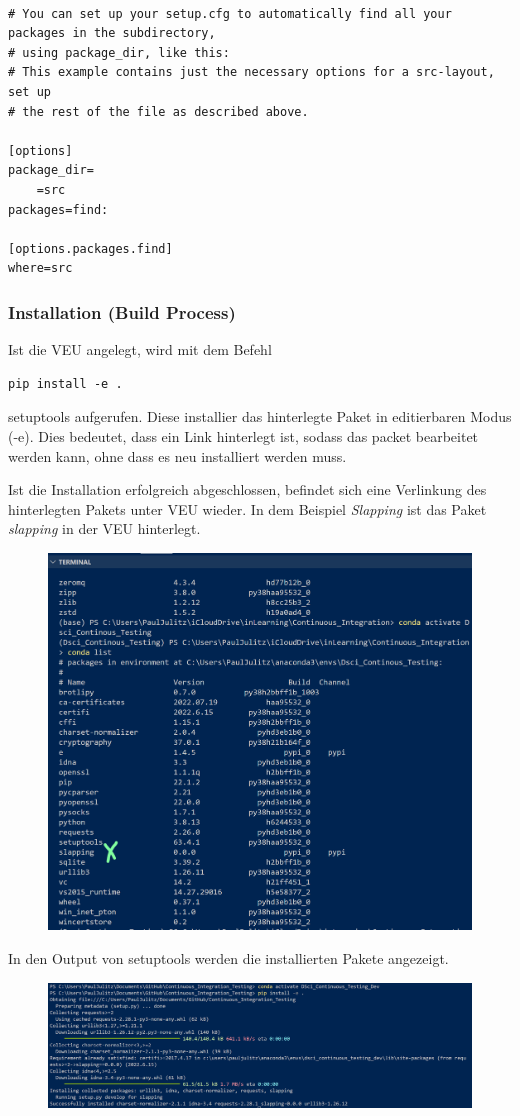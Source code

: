 \begin{lstlisting}[style=Config, caption={Setuptools find all packges}, captionpos=b]

# You can set up your setup.cfg to automatically find all your packages in the subdirectory, 
# using package_dir, like this:
# This example contains just the necessary options for a src-layout, set up
# the rest of the file as described above.

[options]
package_dir=
    =src
packages=find:

[options.packages.find]
where=src
\end{lstlisting}



\subsubsection{Installation (Build Process)}
Ist die \gls{VEU} angelegt, wird mit dem Befehl

\begin{lstlisting}[style=CMD]
	pip install -e .
\end{lstlisting}

setuptools aufgerufen. Diese installier das hinterlegte Paket in editierbaren Modus (-e). 
Dies bedeutet, dass ein Link hinterlegt ist, sodass das packet bearbeitet werden kann, ohne dass es neu installiert werden muss.

Ist die Installation erfolgreich abgeschlossen, befindet sich eine Verlinkung des hinterlegten Pakets unter \gls{VEU} wieder. In dem Beispiel \textit{Slapping} ist das Paket \textit{slapping} in der \gls{VEU} hinterlegt.
\begin{figure}[H]
	\centering
	\includegraphics[scale = 0.4]{attachment/chapter_2/Scc074}
\end{figure}

In den Output von setuptools werden die installierten Pakete angezeigt. 
\begin{figure}[H]
	\centering
	\includegraphics[scale = 0.4]{attachment/chapter_2/Scc076}
\end{figure}
